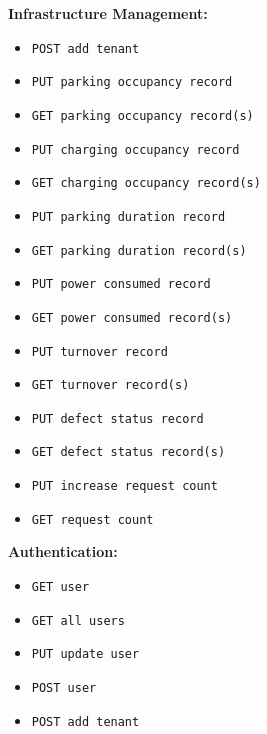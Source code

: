 \textbf{Infrastructure Management:}
\begin{itemize}[noitemsep]
    \item[] \verb|POST add tenant|
    \item[] \verb|PUT parking occupancy record|
    \item[] \verb|GET parking occupancy record(s)|
    \item[] \verb|PUT charging occupancy record|
    \item[] \verb|GET charging occupancy record(s)|
    \item[] \verb|PUT parking duration record|
    \item[] \verb|GET parking duration record(s)|
    \item[] \verb|PUT power consumed record|
    \item[] \verb|GET power consumed record(s)|
    \item[] \verb|PUT turnover record|
    \item[] \verb|GET turnover record(s)|
    \item[] \verb|PUT defect status record|
    \item[] \verb|GET defect status record(s)|
    \item[] \verb|PUT increase request count|
    \item[] \verb|GET request count|
\end{itemize}

\textbf{Authentication:}
\begin{itemize}[noitemsep]
    \item[] \verb|GET user|
    \item[] \verb|GET all users|
    \item[] \verb|PUT update user|
    \item[] \verb|POST user|
    \item[] \verb|POST add tenant|
\end{itemize}
